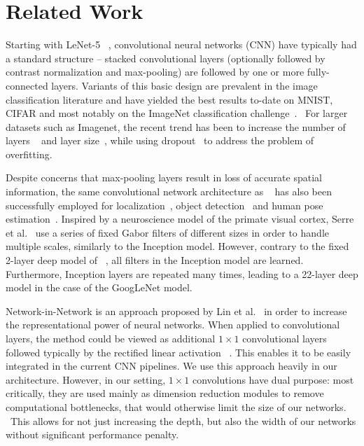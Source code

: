 \section{Related Work}

Starting with LeNet-5 ~\cite{lecun1989backprop}, convolutional neural networks (CNN) have typically had a standard structure -- stacked convolutional layers (optionally followed by contrast normalization and max-pooling) are followed by one or more fully-connected layers. Variants of this basic design are prevalent in the image classification literature and have yielded the best results to-date on MNIST, CIFAR and most notably on the ImageNet classification challenge~\cite{krizhevsky2012imagenet,zeiler2014visualizing}.  For larger datasets such as Imagenet, the recent trend has been to increase the number of layers ~\cite{lin2013nin} and layer size~\cite{zeiler2014visualizing,sermanet2013overfeat}, while using dropout~\cite{hinton2012dropout} to address the problem of overfitting.

Despite concerns that max-pooling layers result in loss of accurate spatial information, the same convolutional network architecture as ~\cite{krizhevsky2012imagenet} has also been successfully employed for localization~\cite{krizhevsky2012imagenet,sermanet2013overfeat}, object detection~\cite{girshick2014rich,sermanet2013overfeat,szegedy2013deep,erhan2014scalable} and human pose estimation~\cite{toshev2013deep}.
Inspired by a neuroscience model of the primate visual cortex, Serre et al.~\cite{serre2007robust} use a series of fixed Gabor filters of different sizes in order to handle multiple scales, similarly to the Inception model. However, contrary to the fixed 2-layer deep model of ~\cite{serre2007robust}, all filters in the Inception model are learned. Furthermore, Inception layers are repeated many times, leading to a 22-layer deep model in the case of the GoogLeNet model.

Network-in-Network is an approach proposed by Lin et al.~\cite{lin2013nin} in order to increase the representational power of neural networks. When applied to convolutional layers, the method could be viewed as additional $1\times 1$ convolutional layers followed typically by the rectified linear activation ~\cite{krizhevsky2012imagenet}. This enables it to be easily integrated in the current CNN pipelines. We use this approach heavily in our architecture. However, in our setting, $1\times 1$ convolutions have dual purpose: most critically, they are used mainly as dimension reduction modules to remove computational bottlenecks, that would otherwise limit the size of our networks.  This allows for not just increasing the depth, but also the width of our networks without significant performance penalty.

